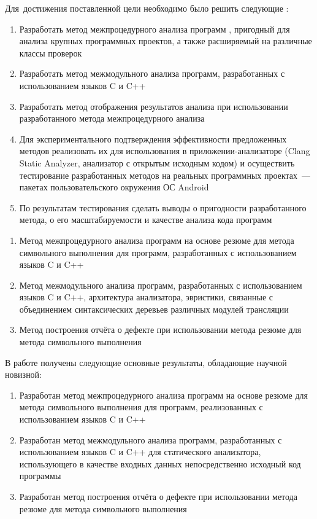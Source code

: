 Для~достижения поставленной цели необходимо было решить следующие {\tasks}:
\begin{enumerate}
  \item Разработать метод межпроцедурного анализа программ , пригодный для анализа крупных программных проектов, а также расширяемый на различные классы проверок
  \item Разработать метод межмодульного анализа программ, разработанных с использованием языков C и C++
  \item Разработать метод отображения результатов анализа при использовании разработанного метода межпроцедурного анализа
  \item Для экспериментального подтверждения эффективности предложенных методов реализовать их для использования в приложении-анализаторе (Clang Static Analyzer, анализатор с открытым исходным кодом) и осуществить тестирование разработанных методов на реальных программных проектах~--- пакетах пользовательского окружения ОС Android
  \item По результатам тестирования сделать выводы о пригодности разработанного метода, о его масштабируемости и качестве анализа кода программ
\end{enumerate}

\begin{enumerate}
  \item Метод межпроцедурного анализа программ на основе резюме для метода символьного выполнения для программ, разработанных с использованием языков C и C++
  \item Метод межмодульного анализа программ, разработанных с использованием языков C и C++, архитектура анализатора, эвристики, связанные с объединением синтаксических деревьев различных модулей трансляции
  \item Метод построения отчёта о дефекте при использовании метода резюме для метода символьного выполнения
\end{enumerate}

\novelty

В работе получены следующие основные результаты, обладающие научной новизной:
\begin{enumerate}
  \item Разработан метод межпроцедурного анализа программ на основе резюме для метода символьного выполнения для программ, реализованных с использованием языков C и C++
  \item Разработан метод межмодульного анализа программ, разработанных с использованием языков C и C++ для статического анализатора, использующего в качестве входных данных непосредственно исходный код программы
  \item Разработан метод построения отчёта о дефекте при использовании метода резюме для метода символьного выполнения
\end{enumerate}

